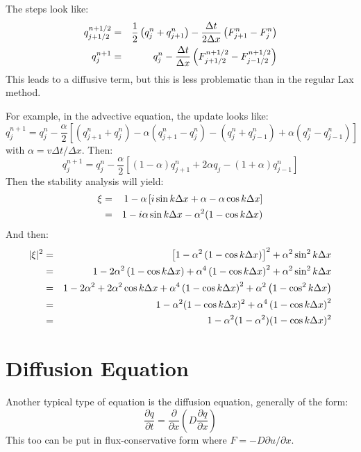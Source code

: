 The steps look like:
\begin{eqnarray}
 q^{n+1/2}_{j+1/2} &=&
   \frac{1}{2} \left(q^{n}_{j} + q^{n}_{j+1}\right)
   - \frac{\Delta t}{2 \Delta x}
    \left(F^{n}_{j+1} - F^{n}_{j}\right) \cr
 q^{n+1}_{j} &=&
   q^{n}_j 
   - \frac{\Delta t}{\Delta x}
    \left(F^{n+1/2}_{j+1/2} - F^{n+1/2}_{j-1/2}\right)
\end{eqnarray}
This leads to a diffusive term, but this is less problematic than in
the regular Lax method.

For example, in the advective equation, the update looks like:
\begin{equation}
 q^{n+1}_{j} = q^n_j -
 \frac{\alpha}{2}
 \left[ \left(q^n_{j+1} + q^n_j\right)
 - \alpha \left(q^n_{j+1} - q^n_{j}\right)
 - \left(q^n_{j} + q^n_{j-1}\right)
 + \alpha \left(q^n_{j} - q^n_{j-1}\right) \right]
\end{equation}
with $\alpha = v \Delta t / \Delta x $. Then:
\begin{equation}
 q^{n+1}_{j} = q^n_j -
 \frac{\alpha}{2}
 \left[ (1-\alpha) q_{j+1}^n + 2\alpha q_j - (1 + \alpha) q_{j-1}^n \right]
\end{equation}
Then the stability analysis will yield:
\begin{eqnarray}
 \xi &=& 1 - \alpha
  \left[ i \sin k\Delta x + \alpha - \alpha \cos k\Delta x\right] \cr
  &=& 1 - i \alpha \sin k \Delta x
   - \alpha^2(1 - \cos k \Delta x)
\end{eqnarray}
And then:
\begin{eqnarray}
 |\xi|^2 &=& 
   \left[1 - \alpha^2 \left(1 - \cos k\Delta x\right)\right]^2
   + \alpha^2 \sin^2 k \Delta x \cr
  &=& 1 - 2\alpha^2 \left(1 - \cos k \Delta x\right)
    + \alpha^4  \left(1 - \cos k \Delta x\right)^2 + \alpha^2 \sin^2
   k \Delta x \cr
  &=& 1 - 2\alpha^2 + 2 \alpha^2 \cos k \Delta x
    + \alpha^4  \left(1 - \cos k \Delta x\right)^2 + \alpha^2
    \left( 1 - \cos^2 k \Delta x \right)\cr
  &=& 1 - \alpha^2 (1 - \cos k \Delta x)^2  
    + \alpha^4  \left(1 - \cos k \Delta x\right)^2 \cr
  &=& 1 - \alpha^2 (1 - \alpha^2) (1 - \cos k \Delta x)^2  
\end{eqnarray}


\section{Diffusion Equation}

Another typical type of equation is the diffusion equation, generally
of the form:
\begin{equation}
\frac{\partial q}{\partial t} = \frac{\partial}{\partial
x} \left(D \frac{\partial q}{\partial x}\right)
\end{equation}
This too can be put in flux-conservative form where $F = -D \partial
u/\partial x$. 

